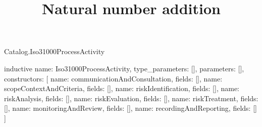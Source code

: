 \begin{lexlean}{Catalog.Iso31000ProcessActivity}
\title{Natural number addition}
\begin{semanticmodule}
inductive{
  name: Iso31000ProcessActivity,
  type_parameters: [],
  parameters: [],
  constructors: [
    {name: communicationAndConsultation, fields: []},
    {name: scopeContextAndCriteria, fields: []},
    {name: riskIdentification, fields: []},
    {name: riskAnalysis, fields: []},
    {name: riskEvaluation, fields: []},
    {name: riskTreatment, fields: []},
    {name: monitoringAndReview, fields: []},
    {name: recordingAndReporting, fields: []}
  ]
}
\end{semanticmodule}
\end{lexlean}
